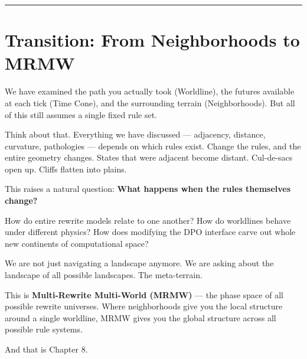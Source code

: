 \begin{center}\rule{0.5\linewidth}{0.5pt}\end{center}

\section{Transition: From Neighborhoods to MRMW}
\label{7.7-transition}

We have examined the path you actually took (Worldline), the futures available at each tick (Time Cone), and the surrounding terrain (Neighborhoods). But all of this still assumes a single fixed rule set.

Think about that. Everything we have discussed --- adjacency, distance, curvature, pathologies --- depends on which rules exist. Change the rules, and the entire geometry changes. States that were adjacent become distant. Cul-de-sacs open up. Cliffs flatten into plains.

This raises a natural question: \textbf{What happens when the rules themselves change?}

How do entire rewrite models relate to one another? How do worldlines behave under different physics? How does modifying the DPO interface carve out whole new continents of computational space?

We are not just navigating a landscape anymore. We are asking about the landscape of all possible landscapes. The meta-terrain.

This is \textbf{Multi-Rewrite Multi-World (MRMW)} --- the phase space of all possible rewrite universes. Where neighborhoods give you the local structure around a single worldline, MRMW gives you the global structure across all possible rule systems.

And that is Chapter 8.
